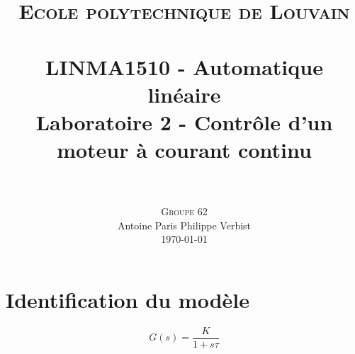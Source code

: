 \documentclass[frenchb, paper=a4, fontsize=11pt]{scrartcl}
\title{
		\usefont{OT1}{bch}{b}{n}
		\normalfont \normalsize \textsc{Ecole polytechnique de Louvain} \\ [25pt]
		\horrule{0.5pt} \\[0.4cm]
		\large LINMA1510 - Automatique linéaire\\
		\huge Laboratoire 2 - Contrôle d'un moteur à courant continu \\
		\horrule{1.5pt} \\[0.5cm]
}
\author{
		\normalfont
		\textsc{Groupe 62}\\
      	Antoine Paris\hspace{0.6cm} Philippe Verbist \\	
       	\normalsize
        \today
}
\date{}
\numberwithin{equation}{section}					%
\numberwithin{figure}{section}					%
\numberwithin{table}{section}						%
\begin{document}
\maketitle

\section{Identification du modèle}

\begin{equation}
	G(s) = \frac{K}{1+s\tau}
\end{equation}


%	
\end{document}
